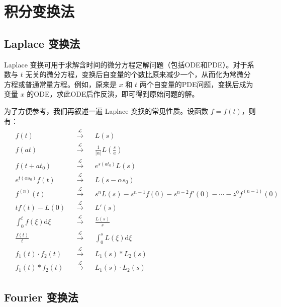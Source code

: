 \documentclass[UTF8]{report}
\theoremstyle{MyLineTheoremStyle} %
\theoremstyle{MyBlockTheoremStyle} %
\theoremstyle{MySubsubsectionStyle} %
\begin{document}
\chapter{积分变换法}\thispagestyle{fancy}

\section{Laplace 变换法}
Laplace 变换可用于求解含时间的微分方程定解问题（包括ODE和PDE）。对于系数与 $t$ 无关的微分方程，变换后自变量的个数比原来减少一个，从而化为常微分方程或普通常量方程。例如，原来是 $x$ 和 $t$ 两个自变量的PDE问题，变换后成为变量 $x$ 的ODE，求此ODE后作反演，即可得到原始问题的解。

为了方便参考，我们再叙述一遍 Laplace 变换的常见性质。设函数 $f = f(t)$，则有：
\begin{gather}
\begin{aligned}
& f(t) &&\overset{\mathscr{L}}{\longrightarrow} && L(s) \\
& f(a t) &&\overset{\mathscr{L}}{\longrightarrow} && \frac{1}{|\alpha|} L(\frac{s}{a})\\
& f(t + a t_0) &&\overset{\mathscr{L}}{\longrightarrow} && e^{s (at_0)}L(s)\\
& e^{t(\alpha s_0)} f(t) &&\overset{\mathscr{L}}{\longrightarrow} && L(s - \alpha s_0)\\
& f^{(n)}(t) &&\overset{\mathscr{L}}{\longrightarrow} && s^n L(s) - s^{n-1}f(0) -  s^{n-2}f'(0) - \cdots - z^0 f^{(n-1)}(0)\\
& t f(t) - L(0) && \overset{\mathscr{L}}{\longrightarrow} && L'(s)\\
& \int_{0}^{t} f(\xi) \mathrm{d}\xi &&\overset{\mathscr{L}}{\longrightarrow} && \frac{L(s)}{s}\\
& \frac{f(t)}{t} &&\overset{\mathscr{L}}{\longrightarrow} && \int_{0}^{s} L(\xi) \mathrm{d}\xi\\
& f_1(t)\cdot f_2(t) &&\overset{\mathscr{L}}{\longrightarrow} && L_1(s) * L_2(s)\\
& f_1(t) * f_2(t)  &&\overset{\mathscr{L}}{\longrightarrow} && L_1(s) \cdot L_2(s)
\end{aligned}
\end{gather}

\section{Fourier 变换法}
\end{document}
